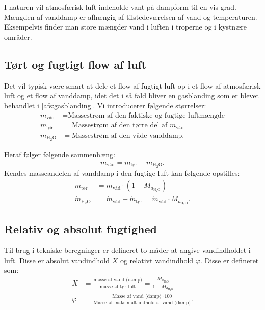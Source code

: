 I naturen vil atmosfærisk luft indeholde vant på dampform til en vis grad. Mængden af vanddamp er afhængig af tilstedeværelsen af vand og temperaturen. Eksempelvis finder man store mængder vand i luften i troperne og i kystnære områder. 

\subsection{Tørt og fugtigt flow af luft}
Det vil typisk være smart at dele et flow af fugtigt luft op i et flow af atmosfærisk luft og et flow af vanddamp, idet det i så fald bliver en gasblanding som er blevet behandlet i \autoref{afs:gasblanding}. Vi introducerer følgende størrelser:
\begin{align*}
  \dot{m}_{\text{våd}} &= \text{Massestrøm af den faktiske og fugtige luftmængde} \\
  \dot{m}_{\text{tør}} &= \text{Massestrøm af den tørre del af } \dot{m}_{\text{våd}} \\
  \dot{m}_{\mathrm{H}_2\mathrm{O}} &= \text{Massestrøm af den våde vanddamp}
.\end{align*}

Heraf følger følgende sammenhæng:
\[ 
\dot{m}_{\text{våd}} = \dot{m}_{\text{tør}} + \dot{m}_{\mathrm{H}_2 \mathrm{O}}
.\]
Kendes masseandelen af vanddamp i den fugtige luft kan følgende opstilles:
\begin{align*}
  \dot{m}_{\text{tør}} &= \dot{m}_{\text{våd}} \cdot (1- M_{a_{\mathrm{H}_2 \mathrm{O}}}) \\
  \dot{m}_{\mathrm{H}_2 \mathrm{O}} &= \dot{m}_{\text{våd}} - \dot{m}_{\text{tør}} = \dot{m}_{\text{våd}} \cdot M_{a_{\mathrm{H}_2 \mathrm{O}}}
.\end{align*}

\subsection{Relativ og absolut fugtighed}
Til brug i tekniske beregninger er defineret to måder at angive vandindholdet i luft. Disse er absolut vandindhold $X$ og relativt vandindhold $\varphi$. Disse er defineret som:
\begin{align*}
  X &= \frac{\text{masse af vand (damp)}}{\text{masse af tør luft}} = \frac{M_{a_{\mathrm{H}_2 \mathrm{O}}}}{1 - M_{a_{\mathrm{H}_2 \mathrm{O}}}} \\
  \varphi &= \frac{\text{Masse af vand (damp)} \cdot 100}{\text{Masse af maksimalt indhold af vand (damp)}}
.\end{align*}


